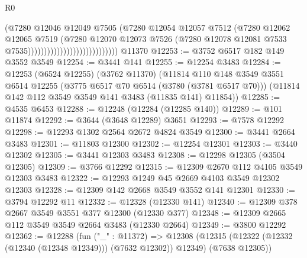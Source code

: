 \begin{lexlean}{R0}
\begin{coremodule}
                                                  (@7280
                                                    @12046
                                                    @12049
                                                    @7505
                                                    (@7280
                                                      @12054
                                                      @12057
                                                      @7512
                                                      (@7280
                                                        @12062
                                                        @12065
                                                        @7519
                                                        (@7280
                                                          @12070
                                                          @12073
                                                          @7526
                                                          (@7280
                                                            @12078
                                                            @12081
                                                            @7533
                                                            @7535))))))))))))))))))))))))))))
    @11370
@12253 := @3752 @6517 @182 @149 @3552 @3549
@12254 := @3441 @141
@12255 := @12254 @3483
@12284 := @12253
    (@6524 @12255)
    (@3762 @11370)
    (@11814
      @110
      @148
      @3549
      @3551
      @6514
      @12255
      (@3775 @6517 @70 @6514 (@3780 (@3781 @6517 @70)))
      (@11814 @142 @112 @3549 @3549 @141 @3483 (@11835 @141) @11854))
@12285 := @4535 @6453
@12288 := @12248 (@12284 (@12285 @140))
@12289 := @101 @11874
@12292 := @3644 (@3648 @12289) @3651
@12293 := @7578 @12292
@12298 := @12293 @1302 @2564 @2672 @4824 @3549
@12300 := @3441 @2664 @3483
@12301 := @11803 @12300
@12302 := @12254 @12301
@12303 := @3440 @12302
@12305 := @3441 @12303 @3483
@12308 := @12298 @12305 (@3504 @12305)
@12309 := @3766 @12292
@12315 := @12309 @2670 @112 @4105 @3549 @12303 @3483
@12322 := @12293 @1249 @45 @2669 @4103 @3549 @12302 @12303
@12328 := @12309 @142 @2668 @3549 @3552 @141 @12301
@12330 := @3794 @12292 @11
@12332 := @12328 (@12330 @141)
@12340 := @12309 @378 @2667 @3549 @3551 @377 @12300 (@12330 @377)
@12348 := @12309 @2665 @112 @3549 @3549 @2664 @3483 (@12330 @2664)
@12349 := @3800 @12292
@12362 := @12288
    (fun ("_" : @11372) =>
    @12308 (@12315 (@12322 (@12332 (@12340 (@12348 @12349))) (@7632 @12302)) @12349) (@7638 @12305))

\end{coremodule}
\end{lexlean}
